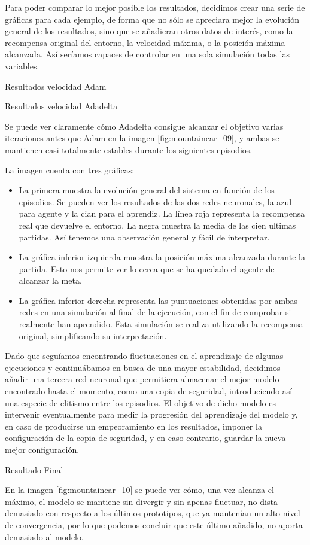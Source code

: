 Para poder comparar lo mejor posible los resultados, decidimos crear una serie de gráficas para cada ejemplo, de forma que no sólo se apreciara mejor la evolución general de los resultados, sino que se añadieran otros datos de interés, como la recompensa original del entorno, la velocidad máxima, o la posición máxima alcanzada. Así seríamos capaces de controlar en una sola simulación todas las variables.

%
       {Resultados velocidad Adam}

%
       {Resultados velocidad Adadelta}

Se puede ver claramente cómo Adadelta consigue alcanzar el objetivo varias iteraciones antes que Adam en la imagen \ref{fig:mountaincar_09}, y ambas se mantienen casi totalmente estables durante los siguientes episodios.

       
La imagen cuenta con tres gráficas:
\begin{itemize}
    \item La primera muestra la evolución general del sistema en función de los episodios. Se pueden ver los resultados de las dos redes neuronales, la azul para agente y la cian para el aprendiz. La línea roja representa la recompensa real que devuelve el entorno. La negra muestra la media de las cien ultimas partidas. Así tenemos una observación general y fácil de interpretar.
    \item La gráfica inferior izquierda muestra la posición máxima alcanzada durante la partida. Esto nos permite ver lo cerca que se ha quedado el agente de alcanzar la meta.
    \item La gráfica inferior derecha representa las puntuaciones obtenidas por ambas redes en una simulación al final de la ejecución, con el fin de comprobar si realmente han aprendido. Esta simulación se realiza utilizando la recompensa original, simplificando su interpretación.  
\end{itemize}

Dado que seguíamos encontrando fluctuaciones en el aprendizaje de algunas ejecuciones y continuábamos en busca de una mayor estabilidad, decidimos añadir una tercera red neuronal que permitiera almacenar el mejor modelo encontrado hasta el momento, como una copia de seguridad, introduciendo así una especie de elitismo entre los episodios. El objetivo de dicho modelo es intervenir eventualmente para medir la progresión del aprendizaje del modelo y, en caso de producirse un empeoramiento en los resultados, imponer la configuración de la copia de seguridad, y en caso contrario, guardar la nueva mejor configuración. 

%
       {Resultado Final}

En la imagen \ref{fig:mountaincar_10} se puede ver cómo, una vez alcanza el máximo, el modelo se mantiene sin divergir y sin apenas fluctuar, no dista demasiado con respecto a los últimos prototipos, que ya mantenían un alto nivel de convergencia, por lo que podemos concluir que este último añadido, no aporta demasiado al modelo. 

